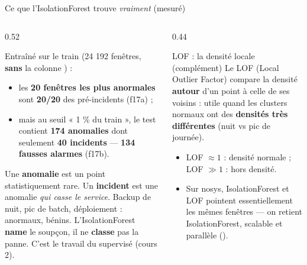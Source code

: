 \begin{frame}{Ce que l'IsolationForest trouve \emph{vraiment} (mesuré)}
\begin{columns}[t]
\begin{column}{0.52\textwidth}
\begin{ebox}
Entraîné sur le train (24 192 fenêtres, \textbf{sans} la colonne
) :
\begin{itemize}
\item les \textbf{20 fenêtres les plus anormales} sont
\textbf{20/20} des pré-incidents (f17a) ;
\item mais au seuil « 1 \% du train », le test contient
\textbf{174 anomalies} dont seulement \textbf{40 incidents}
--- \textbf{134 fausses alarmes} (f17b).
\end{itemize}
\end{ebox}
\begin{wbox}
Une \textbf{anomalie} est un point statistiquement rare. Un
\textbf{incident} est une anomalie \emph{qui casse le service}.
Backup de nuit, pic de batch, déploiement : anormaux, bénins.
L'IsolationForest \textbf{name} le soupçon, il ne \textbf{classe} pas
la panne. C'est le travail du supervisé (cours 2).
\end{wbox}
\end{column}
\begin{column}{0.44\textwidth}
\begin{block}{LOF : la densité locale (complément)}
Le LOF (Local Outlier Factor) compare la densité \textbf{autour} d'un
point à celle de ses voisins : utile quand les clusters normaux ont des
\textbf{densités très différentes} (nuit vs pic de journée).
\begin{itemize}
\item LOF $\approx 1$ : densité normale ; LOF $\gg 1$ : hors densité.
\item Sur nosys, IsolationForest et LOF pointent essentiellement les
mêmes fenêtres --- on retient IsolationForest, scalable et parallèle
().
\end{itemize}
\end{block}
\end{column}
\end{columns}
\end{frame}

